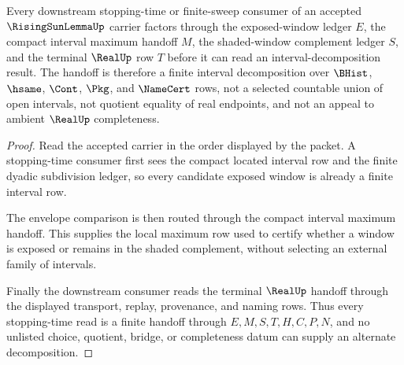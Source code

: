 \begin{theorem}
\label{thm:rising-sun-stopping-time-handoff}
Every downstream stopping-time or finite-sweep consumer of an accepted $\RisingSunLemmaUp$ carrier factors through the exposed-window ledger $E$, the compact interval maximum handoff $M$, the shaded-window complement ledger $S$, and the terminal $\RealUp$ row $T$ before it can read an interval-decomposition result. The handoff is therefore a finite interval decomposition over $\BHist$, $\hsame$, $\Cont$, $\Pkg$, and $\NameCert$ rows, not a selected countable union of open intervals, not quotient equality of real endpoints, and not an appeal to ambient $\RealUp$ completeness.
\end{theorem}
\begin{proof}
Read the accepted carrier in the order displayed by the packet. A stopping-time consumer first sees the compact located interval row and the finite dyadic subdivision ledger, so every candidate exposed window is already a finite interval row.

The envelope comparison is then routed through the compact interval maximum handoff. This supplies the local maximum row used to certify whether a window is exposed or remains in the shaded complement, without selecting an external family of intervals.

Finally the downstream consumer reads the terminal $\RealUp$ handoff through the displayed transport, replay, provenance, and naming rows. Thus every stopping-time read is a finite handoff through $E,M,S,T,H,C,P,N$, and no unlisted choice, quotient, bridge, or completeness datum can supply an alternate decomposition.
\end{proof}
